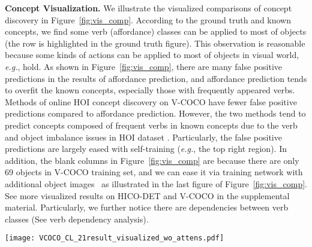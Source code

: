 \documentclass[runningheads]{llncs}
\newcommand{\eg}{\textit{e.g.}}
\begin{document}
{\bf Concept Visualization.} We illustrate the visualized comparisons of concept discovery in Figure~\ref{fig:vis_comp}. According to the ground truth and known concepts, we find some verb (affordance) classes can be applied to most of objects (the row is highlighted in the ground truth figure). This observation is reasonable because some kinds of actions can be applied to most of objects in visual world, \eg, hold. As shown in Figure~\ref{fig:vis_comp}, there are many false positive predictions in the results of affordance prediction, and affordance prediction tends to overfit the known concepts, especially those with frequently appeared verbs. Methods of online HOI concept discovery on V-COCO have fewer false positive predictions compared to affordance prediction. However, the two methods tend to predict concepts composed of frequent verbs in known concepts due to the verb and object imbalance issues in HOI dataset \cite{hou2021fcl}. Particularly, the false positive predictions are largely eased with self-training (\eg, the top right region). In addition, the blank columns in Figure~\ref{fig:vis_comp} are because there are only 69 objects in V-COCO training set, and we can ease it via training network with additional object images~\cite{hou2021atl} as illustrated in the last figure of Figure~\ref{fig:vis_comp}. See more visualized results on HICO-DET and V-COCO in the supplemental material. Particularly, we further notice there are dependencies between verb classes (See verb dependency analysis).

\begin{figure*}
    \texttt{[image: VCOCO\_CL\_21result\_visualized\_wo\_attens.pdf]}
    \caption{Visualized Comparison of different methods on V-COCO dataset. The column is the object classes and the row represents the verb classes. Known Concepts are the concepts that we have known. SCL$-$ means online concept discovery without self-training. For better illustration, we filter out known concepts in proposed methods. ``+ Novel Objects" means self-training with novel object images.}
    \label{fig:vis_comp}
\end{figure*}
\end{document}
